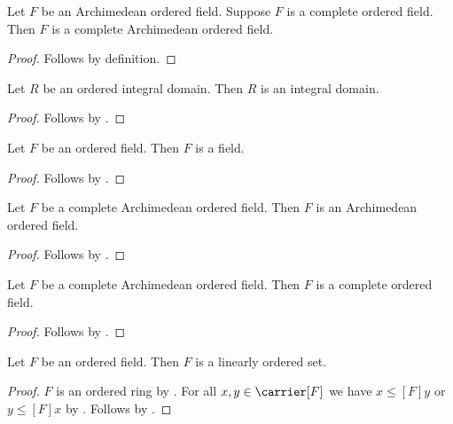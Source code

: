 \begin{proposition}\label{complete_archimedean_ordered_field_intro}
    Let $F$ be an Archimedean ordered field.
    Suppose $F$ is a complete ordered field.
    Then $F$ is a complete Archimedean ordered field.
\end{proposition}
\begin{proof}
    Follows by definition.
\end{proof}

\begin{corollary}\label{ordered_integral_domain_is_integral_domain}
    Let $R$ be an ordered integral domain.
    Then $R$ is an integral domain.
\end{corollary}
\begin{proof}
    Follows by .
\end{proof}

\begin{corollary}\label{ordered_field_is_field}
    Let $F$ be an ordered field.
    Then $F$ is a field.
\end{corollary}
\begin{proof}
    Follows by .
\end{proof}

\begin{corollary}\label{complete_archimedean_ordered_field_is_archimedean}
    Let $F$ be a complete Archimedean ordered field.
    Then $F$ is an Archimedean ordered field.
\end{corollary}
\begin{proof}
    Follows by .
\end{proof}

\begin{corollary}\label{complete_archimedean_ordered_field_is_complete}
    Let $F$ be a complete Archimedean ordered field.
    Then $F$ is a complete ordered field.
\end{corollary}
\begin{proof}
    Follows by .
\end{proof}

\begin{theorem}\label{ordered_field_is_linearly_ordered_set}
    Let $F$ be an ordered field.
    Then $F$ is a linearly ordered set.
\end{theorem}
\begin{proof}
    $F$ is an ordered ring by .
    For all $x,y\in\carrier[F]$ we have
        $x\mathrel{\leq[F]}y$ or $y\mathrel{\leq[F]}x$ by
        .
    Follows by .
\end{proof}


